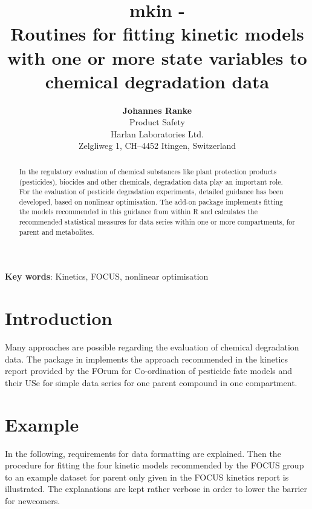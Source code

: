 \documentclass[12pt,a4paper]{article}
\begin{document}
\title{mkin -\\
Routines for fitting kinetic models with one or more state variables to chemical degradation data}
\author{\textbf{Johannes Ranke} \\
Product Safety \\
Harlan Laboratories Ltd. \\
Zelgliweg 1, CH--4452 Itingen, Switzerland}
\maketitle

\begin{abstract}
In the regulatory evaluation of chemical substances like plant protection
products (pesticides), biocides and other chemicals, degradation data play an
important role. For the evaluation of pesticide degradation experiments, 
detailed guidance has been developed, based on nonlinear optimisation. 
The \RR{} add-on package  implements fitting the models
recommended in this guidance from within R and calculates the recommended
statistical measures for data series within one or more compartments,
for parent and metabolites.
\end{abstract}


\thispagestyle{empty} \setcounter{page}{0}

\clearpage

\tableofcontents

\textbf{Key words}: Kinetics, FOCUS, nonlinear optimisation

\section{Introduction}
\label{intro}

Many approaches are possible regarding the evaluation of chemical degradation
data.  The  package \citep{pkg:mkin} in \RR{}
\citep{rcore2010} implements the approach recommended in the kinetics report
provided by the FOrum for Co-ordination of pesticide fate models and their
USe \citep{FOCUS2006} for simple data series for one parent compound in one
compartment.

\section{Example}
\label{exam}

In the following, requirements for data formatting are explained. Then the
procedure for fitting the four kinetic models recommended by the FOCUS group
to an example dataset for parent only given in the FOCUS kinetics report is
illustrated.  The explanations are kept rather verbose in order to lower the
barrier for \RR{} newcomers.
\end{document}
